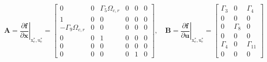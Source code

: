\documentclass[3p]{elsarticle}
\begin{document}
\begin{equation}
    \mathbf{A} = \left.\dfrac{\partial \mathbf{f}}{\partial \mathbf{x}}\right|_{\boldsymbol{{\mathrm{x}}}_e^*, \boldsymbol{{\mathrm{u}}}_e^*} = \begin{bmatrix}
        0 & 0 & \Gamma_5 \Omega_{c, r} & 0 & 0 & 0 \\
        1 & 0 & 0 & 0 & 0 & 0 \\
        -\Gamma_9 \Omega_{c, r} & 0 & 0 & 0 & 0 & 0 \\
        0 & 0 & 1 & 0 & 0 & 0 \\
        0 & 0 & 0 & 0 & 0 & 0 \\
        0 & 0 & 0 & 0 & 1 & 0
    \end{bmatrix}, \quad \mathbf{B} = \left.\dfrac{\partial \mathbf{f}}{\partial \mathbf{u}}\right|_{\boldsymbol{{\mathrm{x}}}_e^*, \boldsymbol{{\mathrm{u}}}_e^*} = 
    \begin{bmatrix}
       \Gamma_3 & 0 & \Gamma_4\\
       0 & 0 & 0 \\
       0 & \Gamma_8 & 0 \\
       0 & 0 & 0 \\
       \Gamma_4 & 0 & \Gamma_{11} \\
       0 & 0 & 0
   \end{bmatrix}
\end{equation}
\end{document}
